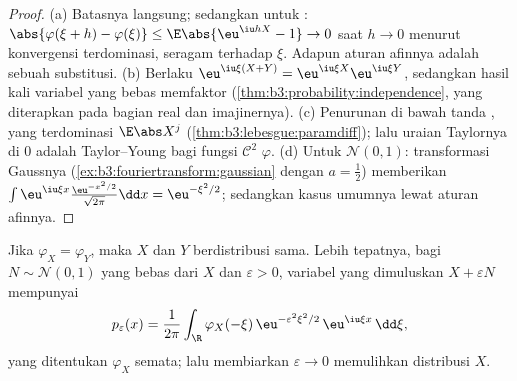 \begin{proof}
(a) Batasnya langsung; sedangkan untuk : $\abs{\varphi(\xi + h)
- \varphi(\xi)} \leq \E\abs{\eu^{\iu hX} - 1} \to 0$ saat $h
\to 0$ menurut konvergensi terdominasi, seragam terhadap $\xi$. Adapun
aturan afinnya adalah sebuah substitusi. (b) Berlaku $\eu^{\iu\xi(X+Y)} =
\eu^{\iu\xi X}\eu^{\iu\xi Y}$, sedangkan  hasil kali
variabel yang bebas memfaktor
(\cref{thm:b3:probability:independence}, yang diterapkan pada bagian real dan
imajinernya). (c) Penurunan di bawah tanda ,
yang terdominasi $\E\abs X^j$
(\cref{thm:b3:lebesgue:paramdiff}); lalu uraian Taylornya di
$0$ adalah Taylor--Young bagi fungsi $\mathcal C^2$
$\varphi$. (d) Untuk $\mathcal N(0,1)$: transformasi Gaussnya
(\cref{ex:b3:fouriertransform:gaussian} dengan $a = \frac12$)
memberikan $\int\eu^{\iu\xi x}\frac{\eu^{-x^2/2}}{\sqrt{2\pi}}\dd
x = \eu^{-\xi^2/2}$; sedangkan kasus umumnya lewat aturan afinnya.
\end{proof}

\begin{theorem}[Keinjektifan]\label{thm:b3:clt:injectivity}
Jika $\varphi_X = \varphi_Y$, maka $X$ dan $Y$ berdistribusi
sama. Lebih tepatnya, bagi $N \sim \mathcal N(0,1)$ yang bebas
dari $X$ dan $\varepsilon > 0$, variabel yang dimuluskan $X +
\varepsilon N$ mempunyai 
\[
p_\varepsilon(x) = \frac1{2\pi}\int_\R
\varphi_X(-\xi)\,\eu^{-\varepsilon^2\xi^2/2}\,
\eu^{\iu\xi x}\,\dd\xi ,
\]
yang ditentukan $\varphi_X$ semata; lalu membiarkan $\varepsilon \to 0$
memulihkan distribusi $X$.
\end{theorem}

